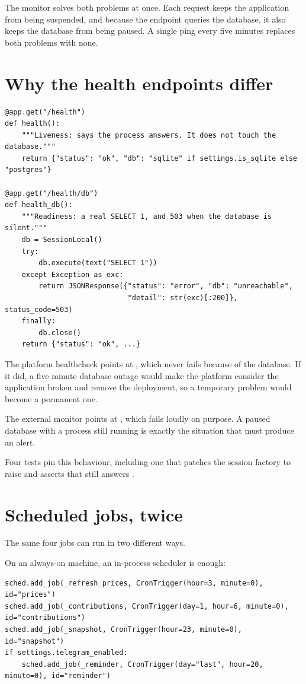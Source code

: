 The monitor solves both problems at once. Each request keeps the application
from being suspended, and because the endpoint queries the database, it also
keeps the database from being paused. A single ping every five minutes replaces
both problems with none.

\section{Why the health endpoints differ}

\begin{lstlisting}[style=py]
@app.get("/health")
def health():
    """Liveness: says the process answers. It does not touch the database."""
    return {"status": "ok", "db": "sqlite" if settings.is_sqlite else "postgres"}

@app.get("/health/db")
def health_db():
    """Readiness: a real SELECT 1, and 503 when the database is silent."""
    db = SessionLocal()
    try:
        db.execute(text("SELECT 1"))
    except Exception as exc:
        return JSONResponse({"status": "error", "db": "unreachable",
                             "detail": str(exc)[:200]}, status_code=503)
    finally:
        db.close()
    return {"status": "ok", ...}
\end{lstlisting}

The platform healthcheck points at , which never fails because of
the database. If it did, a five minute database outage would make the platform
consider the application broken and remove the deployment, so a temporary
problem would become a permanent one.

The external monitor points at , which fails loudly on purpose.
A paused database with a process still running is exactly the situation that
must produce an alert.

Four tests pin this behaviour, including one that patches the session factory to
raise and asserts that  still answers .

\section{Scheduled jobs, twice}

The same four jobs can run in two different ways.

On an always-on machine, an in-process scheduler is enough:

\begin{lstlisting}[style=py]
sched.add_job(_refresh_prices, CronTrigger(hour=3, minute=0), id="prices")
sched.add_job(_contributions, CronTrigger(day=1, hour=6, minute=0), id="contributions")
sched.add_job(_snapshot, CronTrigger(hour=23, minute=0), id="snapshot")
if settings.telegram_enabled:
    sched.add_job(_reminder, CronTrigger(day="last", hour=20, minute=0), id="reminder")
\end{lstlisting}

